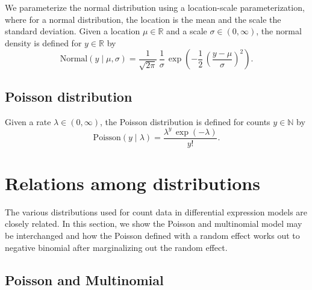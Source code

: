 \documentclass[11pt]{report}
\begin{document}
We parameterize the normal distribution using a location-scale
parameterization, where for a normal distribution, the location is the
mean and the scale the standard deviation.  Given a location $\mu \in
\mathbb{R}$ and a scale $\sigma \in (0, \infty)$, the normal density
is defined for $y \in \mathbb{R}$ by
\[
  \textrm{Normal}(y \mid \mu, \sigma)
  = \frac{1}{\sqrt{2\pi}}
  \, \frac{1}{\sigma}
  \, \exp\!\left( -\frac{1}{2} \, \left( \frac{y - \mu}{\sigma}
                                  \right)^2
           \right).
\]

\section{Poisson distribution}

Given a rate $\lambda \in (0, \infty)$, the Poisson distribution is
defined for counts $y \in \mathbb{N}$ by
\[
  \textrm{Poisson}(y \mid \lambda)
  = \frac{\lambda^y \, \exp(-\lambda)}{y!}.
\]



\chapter{Relations among distributions}

The various distributions used for count data in differential
expression models are closely related. In this section, we show the
Poisson and multinomial model may be interchanged and how the Poisson
defined with a random effect works out to negative binomial after
marginalizing out the random effect.

\section{Poisson and Multinomial}
\end{document}
